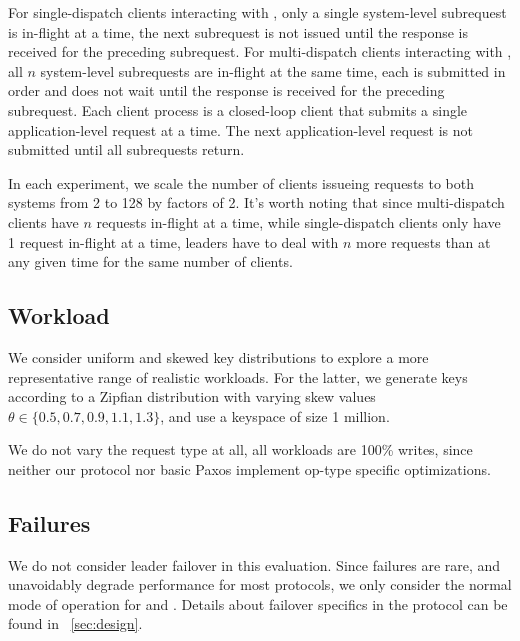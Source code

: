 For single-dispatch clients interacting with \mpaxos, only a single system-level subrequest is in-flight at a time, the next subrequest is not issued until the response is received for the preceding subrequest. For multi-dispatch clients interacting with \system, all $n$ system-level subrequests are in-flight at the same time, each is submitted in order and does not wait until the response is received for the preceding subrequest. Each client process is a closed-loop client that submits a single application-level request at a time. The next application-level request is not submitted until all subrequests return. 

In each experiment, we scale the number of clients issueing requests to both systems from 2 to 128 by factors of 2. It's worth noting that since multi-dispatch clients have $n$ requests in-flight at a time, while single-dispatch clients only have 1 request in-flight at a time, \system leaders have to deal with $n$ more requests than \mpaxos at any given time for the same number of clients.



\subsection{Workload}
We consider uniform and skewed key distributions to explore a more representative range of realistic workloads. For the latter, we generate keys according to a Zipfian distribution with varying skew values $\theta \in \{0.5, 0.7, 0.9, 1.1, 1.3\}$, and use a keyspace of size 1 million. 

We do not vary the request type at all, all workloads are 100\% writes, since neither our protocol nor basic Paxos implement op-type specific optimizations. 

\subsection{Failures}
We do not consider leader failover in this evaluation. Since failures are rare, and unavoidably degrade performance for most protocols, we only consider the normal mode of operation for \system and \mpaxos. Details about failover specifics in the protocol can be found in ~\ref{sec:design}.

